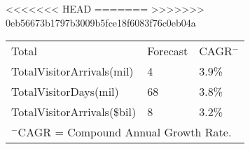 <<<<<<< HEAD
=======
>>>>>>> 0eb56673b1797b3009b5fce18f6083f76c0eb04a
\begin{tabular}[t]{p{5.4cm}p{0.9cm}p{1.2cm}}
 Total & Forecast & CAGR$^-$ \\ 
 TotalVisitorArrivals(mil) & 4 & 3.9\% \\ 
  TotalVisitorDays(mil) & 68 & 3.8\% \\ 
  TotalVisitorArrivals(\$bil) & 8 & 3.2\% \\ 
  
\multicolumn{3}{p{8.25cm}}{$^-$CAGR = Compound Annual Growth Rate.}\\ \end{tabular}
